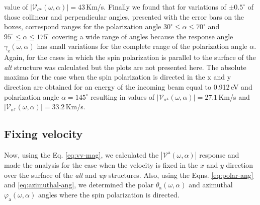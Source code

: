 \documentclass[prb,11pt,tightenlines,twocolumn,aps]{revtex4-1}
\begin{document}
value of $|\mathcal{V}_{\sigma^{\mathrm{z}}}(\omega,\alpha)|=43$\,Km/s. Finally
we found that for variations of $\pm0.5^{\circ}$ of those collinear and
perpendicular angles, presented with the error bars on the boxes, correspond
ranges for the polarization angle $30^{\circ} \leq \alpha \leq 70^{\circ}$ and
$95^{\circ} \leq \alpha \leq 175^{\circ}$ covering a wide range of angles
because the response angle $\gamma_{\mathrm{z}}(\omega,\alpha)$ has small
variations for the complete range of the polarization angle $\alpha$.
% 
Again, for the cases in which the spin polarization is parallel to the surface
of the \emph{alt} structure was calculated but the plots are not presented here.
The absolute maxima for the case when the spin polarization is directed in the
$\mathrm{x}$ and $\mathrm{y}$ direction are obtained for an energy of the
incoming beam equal to 0.912\,eV and polarization angle $\alpha=145^{\circ}$
resulting in values of
$|\mathcal{V}_{\sigma^{\mathrm{x}}}(\omega,\alpha)|=27.1$\,Km/s and
$|\mathcal{V}_{\sigma^{\mathrm{y}}}(\omega,\alpha)|=33.2$\,Km/s.



\subsection{Fixing velocity} %
\label{sec:res-fixvel}



Now, using the Eq. \eqref{eq:vv-mag}, we calculated the
$|\mathcal{V}^{\mathrm{a}}(\omega,\alpha)|$ response and made the analysis for
the case when the velocity is fixed in the $x$ and $y$ direction over the
surface of the \emph{alt} and \emph{up} structures. Also, using the Eqns.
\eqref{eq:polar-ang} and \eqref{eq:azimuthal-ang}, we determined the polar
$\theta_{\mathrm{a}}(\omega,\alpha)$ and azimuthal
$\varphi_{\mathrm{a}}(\omega,\alpha)$ angles where the spin polarization is
directed.
\end{document}

